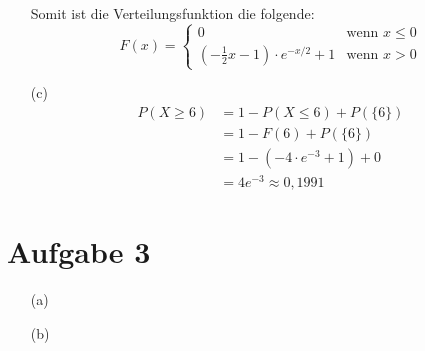 \documentclass[10pt,a4paper]{article}
\begin{document}
\begin{itemize}
Somit ist die Verteilungsfunktion die folgende:
\begin{equation*}
F(x) =
\left\{
	\begin{array}{ll}
		0  & \mbox{wenn } x \leq 0 \\
		\left( -\frac{1}{2}x - 1\right) \cdot e^{-x/2} + 1 & \mbox{wenn } x > 0
	\end{array}
\right.
\end{equation*}

\item[(c)]
\begin{align*}
P(X \geq 6) &= 1 - P(X \leq 6) + P(\{6\})\\
&= 1 - F(6) + P(\{6\})\\
&= 1 - (-4 \cdot e^{-3} +1) + 0\\
&= 4 e^{-3} \approx 0,1991
\end{align*}
\end{itemize}

\section*{Aufgabe 3}
\begin{itemize}

\item[(a)]
\item[(b)]

\end{itemize}
\end{document}
